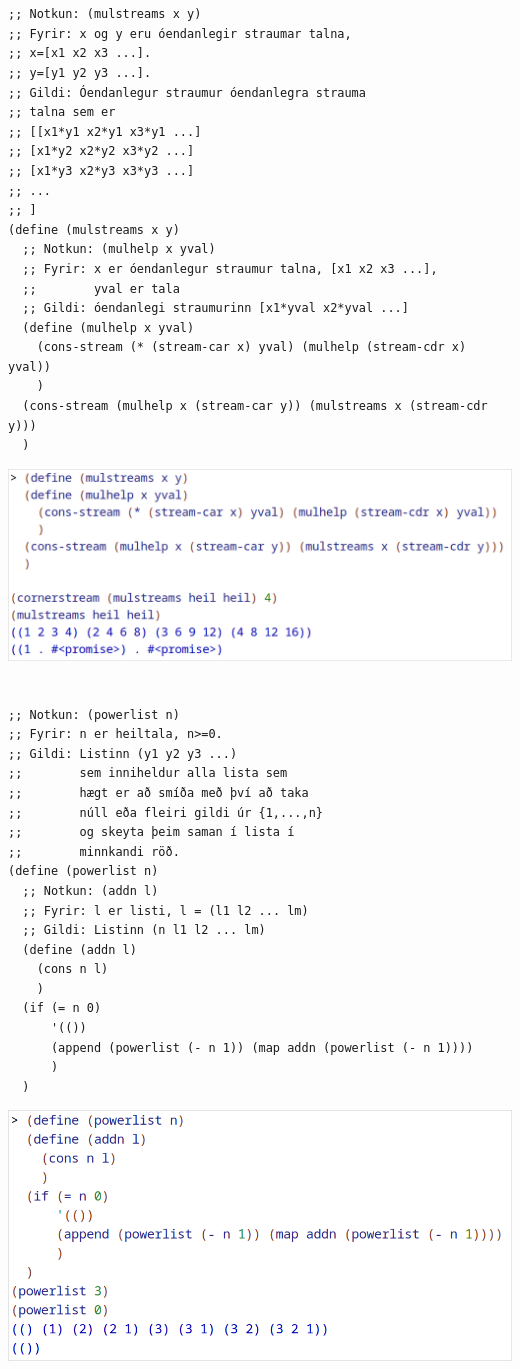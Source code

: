 \documentclass{article}
\begin{document}
	\section{}
	\begin{verbatim}
;; Notkun: (mulstreams x y)
;; Fyrir: x og y eru óendanlegir straumar talna,
;; x=[x1 x2 x3 ...].
;; y=[y1 y2 y3 ...].
;; Gildi: Óendanlegur straumur óendanlegra strauma
;; talna sem er
;; [[x1*y1 x2*y1 x3*y1 ...]
;; [x1*y2 x2*y2 x3*y2 ...]
;; [x1*y3 x2*y3 x3*y3 ...]
;; ...
;; ]
(define (mulstreams x y)
  ;; Notkun: (mulhelp x yval)
  ;; Fyrir: x er óendanlegur straumur talna, [x1 x2 x3 ...],
  ;;        yval er tala
  ;; Gildi: óendanlegi straumurinn [x1*yval x2*yval ...]
  (define (mulhelp x yval)
    (cons-stream (* (stream-car x) yval) (mulhelp (stream-cdr x) yval))
    )
  (cons-stream (mulhelp x (stream-car y)) (mulstreams x (stream-cdr y)))
  )
	\end{verbatim}
	\begin{center}
		\includegraphics[scale=0.35]{mulstreams.png}
	\end{center}

	\newpage
	\section{}
	\begin{verbatim}
;; Notkun: (powerlist n)
;; Fyrir: n er heiltala, n>=0.
;; Gildi: Listinn (y1 y2 y3 ...)
;;        sem inniheldur alla lista sem
;;        hægt er að smíða með því að taka
;;        núll eða fleiri gildi úr {1,...,n}
;;        og skeyta þeim saman í lista í
;;        minnkandi röð.
(define (powerlist n)
  ;; Notkun: (addn l)
  ;; Fyrir: l er listi, l = (l1 l2 ... lm)
  ;; Gildi: Listinn (n l1 l2 ... lm)
  (define (addn l)
    (cons n l)
    )
  (if (= n 0)
      '(())
      (append (powerlist (- n 1)) (map addn (powerlist (- n 1))))
      )
  )
	\end{verbatim}
	\begin{center}
		\includegraphics[scale=0.35]{powerlist.png}
	\end{center}
\end{document}
